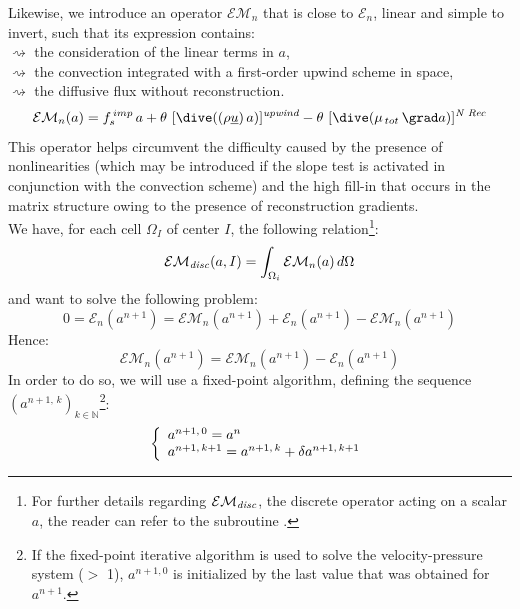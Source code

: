 Likewise, we introduce an operator $\mathcal{EM}_{n}$ that is close to
$\mathcal{E}_{n}$, linear and simple to invert, such that its
expression contains:\\
\hspace*{1.cm}$\rightsquigarrow$ the consideration of the linear terms in $a$,\\
\hspace*{1.cm}$\rightsquigarrow$ the convection integrated with a first-order upwind scheme in space,\\
\hspace*{1.cm}$\rightsquigarrow$ the diffusive flux without reconstruction.\\
\begin{equation}
\mathcal{EM}_{n}(a) = f_s^{\,imp}\,a + \theta\,\,[\dive((\rho
\underline{u})\,a)]^{\textit{upwind}} - \theta\,\, [\dive(\mu_{\,tot}\,\grad a)]^{\textit{N Rec}}
\end{equation}
This operator helps circumvent the difficulty caused by the presence of nonlinearities (which may be introduced if the slope test is activated in conjunction with the convection scheme) and the high fill-in that occurs in the matrix structure owing to the presence of reconstruction gradients.\\
We have, for each cell $\Omega_I$ of center $I$, the following relation\footnote{For further details regarding $\mathcal{EM_{\it{disc}}}$, the discrete operator acting on a scalar $a$, the reader can refer to the subroutine
.}:
\begin{equation}\notag
\mathcal{EM_{\it{disc}}}(a,I) = \int_{\Omega_i}\mathcal{EM}_{n}(a)  \, d\Omega
\end{equation}
and want to solve the following problem:
\begin{equation}
0 =\mathcal{E}_{n}(a^{n+1}) =  \mathcal{EM}_{n}(a^{n+1}) +  \mathcal{E}_{n}(a^{n+1}) - \mathcal{EM}_{n}(a^{n+1})
\end{equation}
Hence:
\begin{equation}
\mathcal{EM}_{n}(a^{n+1}) =  \mathcal{EM}_{n}(a^{n+1}) -  \mathcal{E}_{n}(a^{n+1})
\end{equation}
In order to do so, we will use a fixed-point algorithm, defining the
sequence $(a^{n+1,\,k})_{k\in \mathbb{N}}$\footnote{If the fixed-point iterative algorithm is used
to solve the velocity-pressure system ($>$ 1), $a^{n+1,0}$ is initialized by
the last value that was obtained for $a^{n+1}$.}:
\begin{equation}\notag
\left\{\begin{array}{l}
a^{n+1,\,0} = a^{n}\\
a^{n+1,\,k+1} = a^{n+1,\,k} + \delta a^{n+1,\,k+1}
\end{array}\right.
\end{equation}

